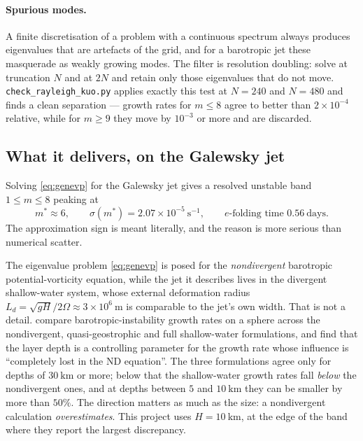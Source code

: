 \documentclass[11pt,a4paper]{article}
\newcommand{\file}[1]{\texttt{\nolinkurl{#1}}}
\begin{document}
\paragraph{Spurious modes.} A finite discretisation of a problem with a
continuous spectrum always produces eigenvalues that are artefacts of the grid,
and for a barotropic jet these masquerade as weakly growing modes. The filter is
resolution doubling: solve at truncation $N$ and at $2N$ and retain only those
eigenvalues that do not move. \file{check_rayleigh_kuo.py} applies exactly
this test at $N = 240$ and $N = 480$ and finds a clean separation --- growth
rates for $m \le 8$ agree to better than $2\times10^{-4}$ relative, while for
$m \ge 9$ they move by $10^{-3}$ or more and are discarded.

\subsection{What it delivers, on the Galewsky jet}

Solving \eqref{eq:genevp} for the Galewsky jet gives a resolved unstable band
$1 \le m \le 8$ peaking at
%
\begin{equation}
m^{*} \approx 6 , \qquad
\sigma(m^{*}) = 2.07\times10^{-5}\ \mathrm{s^{-1}},
\qquad
\text{$e$-folding time } 0.56\ \text{days} .
\label{eq:galewskygrowth}
\end{equation}
%
The approximation sign is meant literally, and the reason is more serious than
numerical scatter.

The eigenvalue problem \eqref{eq:genevp} is posed for the \emph{nondivergent}
barotropic potential-vorticity equation, while the jet it describes lives in the
divergent shallow-water system, whose external deformation radius
$L_d = \sqrt{gH}/2\Omega \approx 3\times10^{6}\ \mathrm{m}$ is comparable to the
jet's own width. That is not a detail. \citet{paldor2020} compare
barotropic-instability growth rates on a sphere across the nondivergent,
quasi-geostrophic and full shallow-water formulations, and find that the layer
depth is a controlling parameter for the growth rate whose influence is
``completely lost in the ND equation''. The three formulations agree only for
depths of $30\ \mathrm{km}$ or more; below that the shallow-water growth rates
fall \emph{below} the nondivergent ones, and at depths between $5$ and
$10\ \mathrm{km}$ they can be smaller by more than $50\%$. The direction matters
as much as the size: a nondivergent calculation \emph{overestimates}. This
project uses $H = 10\ \mathrm{km}$, at the edge of the band where they report the
largest discrepancy.
\end{document}
